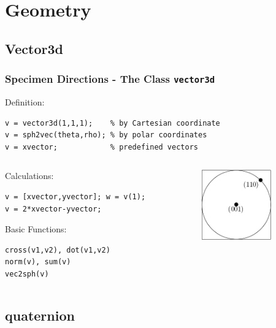 \section{Geometry}



\subsection*{Vector3d}

\begin{frame}[fragile]
  \frametitle{Specimen Directions - The \MTEX Class \texttt{\bf vector3d}}

  Definition:

\begin{lstlisting}
v = vector3d(1,1,1);    % by Cartesian coordinate
v = sph2vec(theta,rho); % by polar coordinates
v = xvector;            % predefined vectors
\end{lstlisting}

  \medskip

  \begin{columns}
    \begin{column}{8.5cm}

      Calculations:

\begin{lstlisting}
v = [xvector,yvector]; w = v(1);
v = 2*xvector-yvector;
\end{lstlisting}

    \medskip

    Basic Functions:

\begin{lstlisting}
cross(v1,v2), dot(v1,v2)
norm(v), sum(v)
vec2sph(v)
\end{lstlisting}
  \end{column}
  \begin{column}{3cm}
   \includegraphics[width=3cm]{pic/vector3d}
  \end{column}
\end{columns}



\end{frame}

\subsection*{quaternion}


